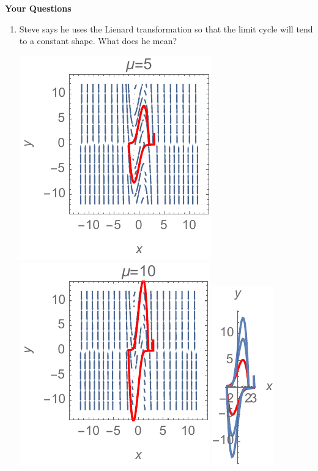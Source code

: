 \documentclass[12pt,letterpaper,noanswers]{exam}
\begin{document}
\noindent\textbf{Your Questions}
\begin{enumerate}
    \item Steve says he uses the Lienard transformation so that the limit cycle will tend to a constant shape.  What does he mean?
    
    \includegraphics{img/C16vdp-p1a.pdf}
     \includegraphics{img/C16vdp-p1b.pdf}\hfill
      \includegraphics{img/C16vdp-p1c.pdf}
      

\end{enumerate}
\end{document}
